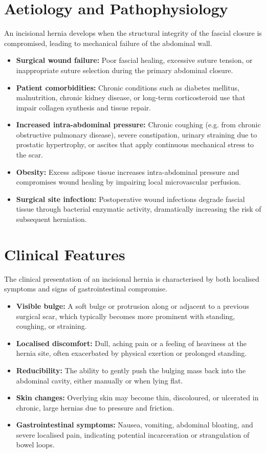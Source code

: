 \section*{Aetiology and Pathophysiology}
An incisional hernia develops when the structural integrity of the fascial closure is compromised, leading to mechanical failure of the abdominal wall.
\begin{itemize}
    \item \textbf{Surgical wound failure:} Poor fascial healing, excessive suture tension, or inappropriate suture selection during the primary abdominal closure.
    \item \textbf{Patient comorbidities:} Chronic conditions such as diabetes mellitus, malnutrition, chronic kidney disease, or long-term corticosteroid use that impair collagen synthesis and tissue repair.
    \item \textbf{Increased intra-abdominal pressure:} Chronic coughing (e.g. from chronic obstructive pulmonary disease), severe constipation, urinary straining due to prostatic hypertrophy, or ascites that apply continuous mechanical stress to the scar.
    \item \textbf{Obesity:} Excess adipose tissue increases intra-abdominal pressure and compromises wound healing by impairing local microvascular perfusion.
    \item \textbf{Surgical site infection:} Postoperative wound infections degrade fascial tissue through bacterial enzymatic activity, dramatically increasing the risk of subsequent herniation.
\end{itemize}

\section*{Clinical Features}
The clinical presentation of an incisional hernia is characterised by both localised symptoms and signs of gastrointestinal compromise.
\begin{itemize}
    \item \textbf{Visible bulge:} A soft bulge or protrusion along or adjacent to a previous surgical scar, which typically becomes more prominent with standing, coughing, or straining.
    \item \textbf{Localised discomfort:} Dull, aching pain or a feeling of heaviness at the hernia site, often exacerbated by physical exertion or prolonged standing.
    \item \textbf{Reducibility:} The ability to gently push the bulging mass back into the abdominal cavity, either manually or when lying flat.
    \item \textbf{Skin changes:} Overlying skin may become thin, discoloured, or ulcerated in chronic, large hernias due to pressure and friction.
    \item \textbf{Gastrointestinal symptoms:} Nausea, vomiting, abdominal bloating, and severe localised pain, indicating potential incarceration or strangulation of bowel loops.
\end{itemize}

